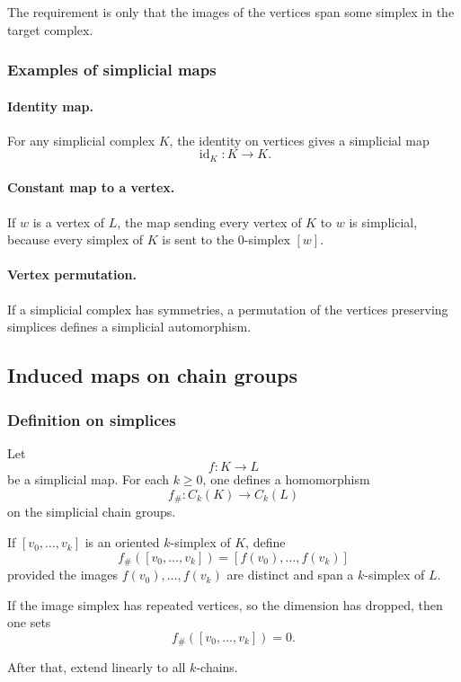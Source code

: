 \documentclass[12pt,a4paper]{article}
\theoremstyle{notespace}
\begin{document}
The requirement is only that the images of the vertices span some simplex in the target complex.

\subsubsection{Examples of simplicial maps}

\paragraph{Identity map.}
For any simplicial complex \(K\), the identity on vertices gives a simplicial map
\[
\operatorname{id}_K:K\to K.
\]

\paragraph{Constant map to a vertex.}
If \(w\) is a vertex of \(L\), the map sending every vertex of \(K\) to \(w\) is simplicial, because every simplex of \(K\) is sent to the \(0\)-simplex \([w]\).

\paragraph{Vertex permutation.}
If a simplicial complex has symmetries, a permutation of the vertices preserving simplices defines a simplicial automorphism.

\subsection{Induced maps on chain groups}

\subsubsection{Definition on simplices}

Let
\[
f:K\to L
\]
be a simplicial map. For each \(k\ge 0\), one defines a homomorphism
\[
f_\#:C_k(K)\to C_k(L)
\]
on the simplicial chain groups.

If \([v_0,\dots,v_k]\) is an oriented \(k\)-simplex of \(K\), define
\[
f_\#([v_0,\dots,v_k])=
[f(v_0),\dots,f(v_k)]
\]
provided the images \(f(v_0),\dots,f(v_k)\) are distinct and span a \(k\)-simplex of \(L\).

If the image simplex has repeated vertices, so the dimension has dropped, then one sets
\[
f_\#([v_0,\dots,v_k])=0.
\]

After that, extend linearly to all \(k\)-chains.
\end{document}
